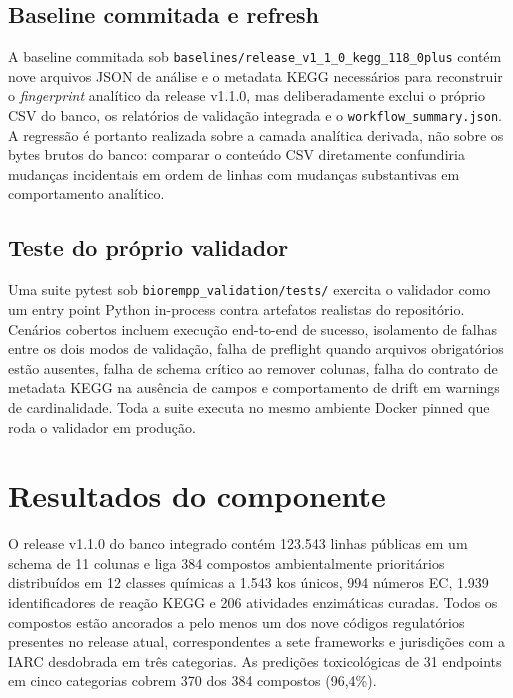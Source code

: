 \subsection{Baseline commitada e refresh}

A baseline commitada sob \texttt{baselines/release\_v1\_1\_0\_kegg\_118\_0plus} contém nove arquivos JSON de análise e o metadata KEGG necessários para reconstruir o \textit{fingerprint} analítico da release v1.1.0, mas deliberadamente exclui o próprio CSV do banco, os relatórios de validação integrada e o \texttt{workflow\_summary.json}. A regressão é portanto realizada sobre a camada analítica derivada, não sobre os bytes brutos do banco: comparar o conteúdo CSV diretamente confundiria mudanças incidentais em ordem de linhas com mudanças substantivas em comportamento analítico.

\subsection{Teste do próprio validador}

Uma suite pytest sob \texttt{biorempp\_validation/tests/} exercita o validador como um entry point Python in-process contra artefatos realistas do repositório. Cenários cobertos incluem execução end-to-end de sucesso, isolamento de falhas entre os dois modos de validação, falha de preflight quando arquivos obrigatórios estão ausentes, falha de schema crítico ao remover colunas, falha do contrato de metadata KEGG na ausência de campos e comportamento de drift em warnings de cardinalidade. Toda a suite executa no mesmo ambiente Docker pinned que roda o validador em produção.

\section{Resultados do componente}
\label{sec:c1-resultados}

O release v1.1.0 do banco integrado \biorempp{} contém 123.543 linhas públicas em um schema de 11 colunas e liga 384 compostos ambientalmente prioritários distribuídos em 12 classes químicas a 1.543 \glspl{ko} únicos, 994 números EC, 1.939 identificadores de reação KEGG e 206 atividades enzimáticas curadas. Todos os compostos estão ancorados a pelo menos um dos nove códigos regulatórios presentes no release atual, correspondentes a sete frameworks e jurisdições com a IARC desdobrada em três categorias. As predições toxicológicas de 31 endpoints em cinco categorias cobrem 370 dos 384 compostos (96,4\%).

